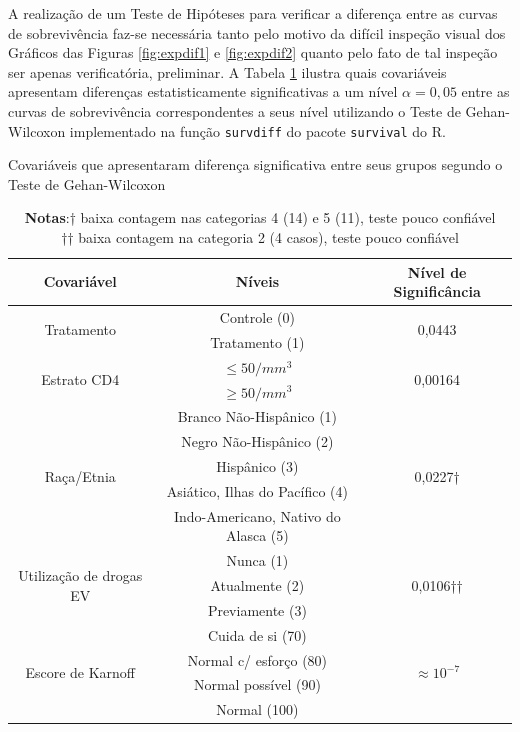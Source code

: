 \documentclass[
	12pt,				%
	openright,			%
	twoside,			%
	a4paper,			%
	english,			%
	brazil				%
	]{abntex2}
\begin{document}
A realização de um Teste de Hipóteses para verificar a diferença entre as curvas de sobrevivência faz-se necessária tanto pelo motivo da difícil inspeção visual dos Gráficos das Figuras \ref{fig:expdif1} e \ref{fig:expdif2} quanto pelo fato de tal inspeção ser apenas verificatória, preliminar. A Tabela \ref{tab:expdif1} ilustra quais covariáveis apresentam diferenças estatisticamente significativas a um nível $\alpha = 0,05$ entre as curvas de sobrevivência correspondentes a seus nível utilizando o Teste de Gehan-Wilcoxon implementado na função \texttt{survdiff} do pacote \texttt{survival} do R.

\begin{table}[!ht]
	\caption{Covariáveis que apresentaram diferença significativa entre seus grupos segundo o Teste de Gehan-Wilcoxon}
    \label{tab:expdif1}
    \centering
	\begin{tabular}{ccc}
    	\hline
		Covariável & Níveis &Nível de Significância \\\hline
        \multirow{2}{*}{Tratamento} & Controle (0) & \multirow{2}{*}{0,0443} \\
        						\   & Tratamento (1) \\\hline
         \multirow{2}{*}{Estrato CD4} & $\leq 50/mm^3$ & \multirow{2}{*}{0,00164} \\
         						\ & $\geq 50/mm^3$ & \\\hline
         \multirow{5}{*}{Raça/Etnia} & Branco Não-Hispânico (1) & \multirow{5}{*}{0,0227†} \\
         						\ & Negro Não-Hispânico (2) & \\
                                \ & Hispânico (3) & \\
                                \ & Asiático, Ilhas do Pacífico (4) & \\
                                \ & Indo-Americano, Nativo do Alasca (5) & \\\hline	
         \multirow{3}{*}{Utilização de drogas EV} & Nunca (1) & \multirow{3}{*}{0,0106††} \\
         						\ & Atualmente (2) & \\
                                \ & Previamente (3) & \\\hline
          \multirow{4}{*}{Escore de Karnoff} & Cuida de si (70) & \multirow{4}{*}{$\approx 10^{-7}$} \\
          						\ & Normal c/ esforço (80) & \\
                                \ & Normal possível (90) & \\
                                \ & Normal (100) & \\\hline
                                
         
	\end{tabular}
    \caption*{\textbf{Notas}:\tiny{† baixa contagem nas categorias 4 (14) e 5 (11), teste pouco confiável}\\ 
    \tiny{†† baixa contagem na categoria 2 (4 casos), teste pouco confiável}} 
\end{table}
\end{document}
